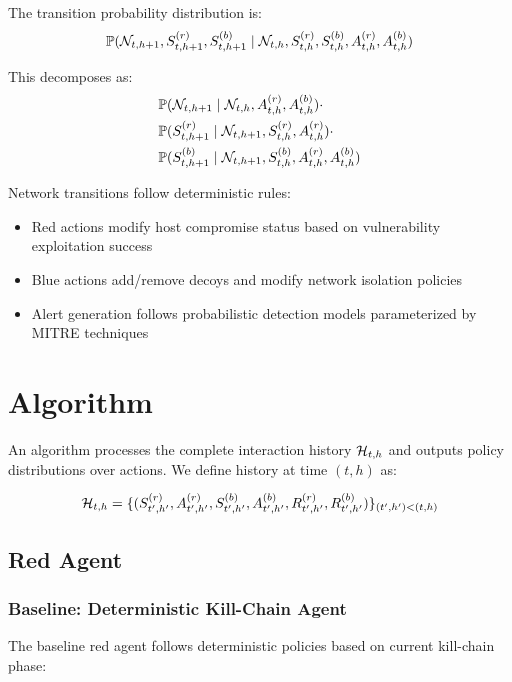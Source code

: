\documentclass[11pt]{article}
\newcounter{phase}[algorithm]
\theoremstyle{definition}
\theoremstyle{plain}
\begin{document}
The transition probability distribution is:
\begin{equation}
\mathbb{P}(\mathcal{N}_{t,h+1}, S_{t,h+1}^{(r)}, S_{t,h+1}^{(b)} \mid \mathcal{N}_{t,h}, S_{t,h}^{(r)}, S_{t,h}^{(b)}, A_{t,h}^{(r)}, A_{t,h}^{(b)})
\end{equation}

This decomposes as:
\begin{align}
&\mathbb{P}(\mathcal{N}_{t,h+1} \mid \mathcal{N}_{t,h}, A_{t,h}^{(r)}, A_{t,h}^{(b)}) \cdot \\
&\mathbb{P}(S_{t,h+1}^{(r)} \mid \mathcal{N}_{t,h+1}, S_{t,h}^{(r)}, A_{t,h}^{(r)}) \cdot \\
&\mathbb{P}(S_{t,h+1}^{(b)} \mid \mathcal{N}_{t,h+1}, S_{t,h}^{(b)}, A_{t,h}^{(r)}, A_{t,h}^{(b)})
\end{align}

Network transitions follow deterministic rules:
\begin{itemize}
    \item Red actions modify host compromise status based on vulnerability exploitation success
    \item Blue actions add/remove decoys and modify network isolation policies
    \item Alert generation follows probabilistic detection models parameterized by MITRE techniques
\end{itemize}

\section{Algorithm}

An algorithm processes the complete interaction history $\mathcal{H}_{t,h}$ and outputs policy distributions over actions. We define history at time $(t,h)$ as:

\begin{equation}
\mathcal{H}_{t,h} = \{(S_{t',h'}^{(r)}, A_{t',h'}^{(r)}, S_{t',h'}^{(b)}, A_{t',h'}^{(b)}, R_{t',h'}^{(r)}, R_{t',h'}^{(b)})\}_{(t',h') < (t,h)}
\end{equation}

\subsection{Red Agent}

\subsubsection{Baseline: Deterministic Kill-Chain Agent}
The baseline red agent follows deterministic policies based on current kill-chain phase:
\end{document}
